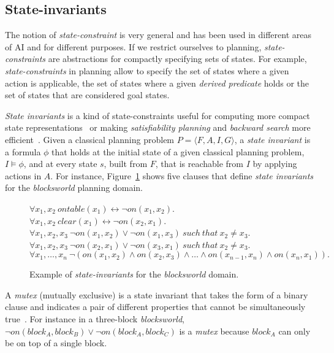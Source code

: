 \documentclass{article}
\newcommand{\tup}[1]{{\langle #1 \rangle}}
\begin{document}
\subsection{State-invariants}
The notion of {\em state-constraint} is very general and has been used in different areas of AI and for different purposes.  If we restrict ourselves to planning, {\em state-constraints} are abstractions for compactly specifying sets of states. For example, {\em state-constraints} in planning allow to specify the set of states where a given action is applicable, the set of states where a given {\em derived predicate} holds or the set of states that are considered goal states.

{\em State invariants} is a kind of state-constraints useful for computing more compact state representations~\cite{helmert2009concise} or making {\em satisfiability planning} and {\em backward search} more efficient~\cite{rintanen2014madagascar,alcazar2015reminder}. Given a classical planning problem $P=\tup{F,A,I,G}$, a {\em state invariant} is a formula $\phi$ that holds at the initial state of a given classical planning problem, $I\models \phi$, and at every state $s$, built from $F$, that is reachable from $I$ by applying actions in $A$. For instance, Figure~\ref{fig:strongest-invariant} shows five clauses that define {\em state invariants} for the {\em blocksworld} planning domain. 

\begin{figure}[hbt!]
  \begin{footnotesize}
$\forall x_1,x_2\ ontable(x_1)\leftrightarrow\neg on(x_1,x_2)$.\\
$\forall x_1,x_2\ clear(x_1)\leftrightarrow\neg on(x_2,x_1)$.\\
$\forall x_1,x_2,x_3\ \neg on(x_1,x_2)\vee\neg on(x_1,x_3)\ such\ that\ x_2\neq x_3$.\\
$\forall x_1,x_2,x_3\ \neg on(x_2,x_1)\vee\neg on(x_3,x_1)\ such\ that\ x_2\neq x_3$.\\
$\forall x_1,\ldots,x_n\ \neg(on(x_1,x_2)\wedge on(x_2,x_3)\wedge\ldots\wedge on(x_{n-1},x_n)\wedge on(x_n,x_1)).$
\end{footnotesize}
 \caption{\small Example of {\em state-invariants} for the {\em blocksworld} domain.}
\label{fig:strongest-invariant}
\end{figure}

A {\em mutex} (mutually exclusive) is a state invariant that takes the form of a binary clause and indicates a pair of different properties that cannot be simultaneously true~\cite{kautz:mutex:IJCAI1999}. For instance in a three-block {\em blocksworld}, $\neg on(block_A,block_B)\vee \neg on(block_A,block_C)$ is a {\em mutex} because $block_A$ can only be on top of a single block.
\end{document}
